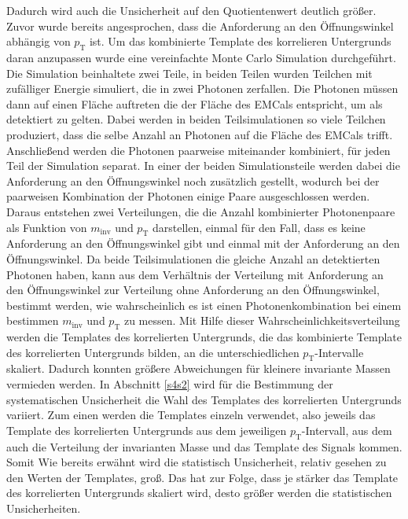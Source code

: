 Dadurch wird auch die Unsicherheit auf den Quotientenwert deutlich größer.
\newline
Zuvor wurde bereits angesprochen, dass die Anforderung an den Öffnungswinkel abhängig von $p_\text{T}$ ist.
Um das kombinierte Template des korrelieren Untergrunds daran anzupassen wurde eine vereinfachte Monte Carlo Simulation durchgeführt.
Die Simulation beinhaltete zwei Teile, in beiden Teilen wurden Teilchen mit zufälliger Energie simuliert, die in zwei Photonen zerfallen.
Die Photonen müssen dann auf einen Fläche auftreten die der Fläche des EMCals entspricht, um als detektiert zu gelten.
Dabei werden in beiden Teilsimulationen so viele Teilchen produziert, dass die selbe Anzahl an Photonen auf die Fläche des EMCals trifft.
Anschließend werden die Photonen paarweise miteinander kombiniert, für jeden Teil der Simulation separat.
In einer der beiden Simulationsteile werden dabei die Anforderung an den Öffnungswinkel noch zusätzlich gestellt, wodurch bei der paarweisen Kombination der Photonen einige Paare ausgeschlossen werden.
Daraus entstehen zwei Verteilungen, die die Anzahl kombinierter Photonenpaare als Funktion von $m_\text{inv}$ und $p_\text{T}$ darstellen, einmal für den Fall, dass es keine Anforderung an den Öffnungswinkel gibt und einmal mit der Anforderung an den Öffnungswinkel.
Da beide Teilsimulationen die gleiche Anzahl an detektierten Photonen haben, kann aus dem Verhältnis der Verteilung mit Anforderung an den Öffnungswinkel zur Verteilung ohne Anforderung an den Öffnungswinkel, bestimmt werden, wie wahrscheinlich es ist einen Photonenkombination bei einem bestimmen $m_\text{inv}$ und $p_\text{T}$ zu messen.
Mit Hilfe dieser Wahrscheinlichkeitsverteilung werden die Templates des korrelierten Untergrunds, die das kombinierte Template des korrelierten Untergrunds bilden, an die unterschiedlichen $p_\text{T}$-Intervalle skaliert.
Dadurch konnten größere Abweichungen für kleinere invariante Massen vermieden werden.
\newline
In Abschnitt \ref{s4s2} wird für die Bestimmung der systematischen Unsicherheit die Wahl des Templates des korrelierten Untergrunds variiert.
\newline
Zum einen werden die Templates einzeln verwendet, also jeweils das Template des korrelierten Untergrunds aus dem jeweiligen $p_\text{T}$-Intervall, aus dem auch die Verteilung der invarianten Masse und das Template des Signals kommen.
Somit 
Wie bereits erwähnt wird die statistisch Unsicherheit, relativ gesehen zu den Werten der Templates, groß.
Das hat zur Folge, dass je stärker das Template des korrelierten Untergrunds skaliert wird, desto größer werden die statistischen Unsicherheiten.

